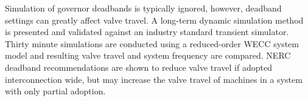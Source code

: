 Simulation of governor deadbands is typically ignored, however, deadband settings can greatly affect valve travel.
A long-term dynamic simulation method is presented and validated against an industry standard transient simulator.
Thirty minute simulations are conducted using a reduced-order WECC system model and resulting valve travel and system frequency are compared.
NERC deadband recommendations are shown to reduce valve travel if adopted interconnection wide, but may increase the valve travel of machines in a system with only partial adoption.